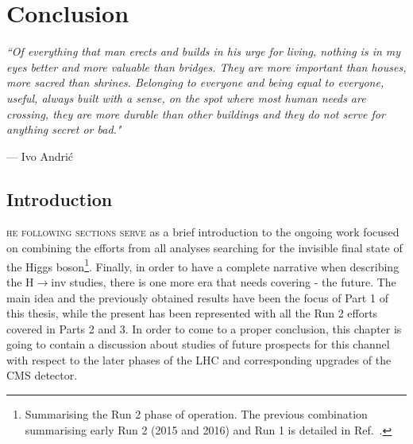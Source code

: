 \chapter{Conclusion}
\label{ch:conclusion}
\epigraph{\itshape``Of everything that man erects and builds in his urge for living, nothing is in my eyes better and more valuable than bridges. They are more important than houses, more sacred than shrines. Belonging to everyone and being equal to everyone, useful, always built with a sense, on the spot where most human needs are crossing, they are more durable than other buildings and they do not serve for anything secret or bad."}{--- \textup{Ivo Andri\' c}}

\section{Introduction}
\hspace{10pt}\lettrine[lines=2]{}{he following sections serve} as a brief introduction to the ongoing work focused on combining the efforts from all analyses searching for the invisible final state of the Higgs boson\footnote{Summarising the Run 2 phase of operation. The previous combination summarising early Run 2 (2015 and 2016) and Run 1 is detailed in Ref.~\cite{paper:HIG_17_023}.}. %
Finally, in order to have a complete narrative when describing the H$\rightarrow$inv studies, there is one more era that needs covering - the future. The main idea and the previously obtained results have been the focus of Part 1 of this thesis, while the present has been represented with all the Run 2 efforts covered in Parts 2 and 3. In order to come to a proper conclusion, this chapter is going to contain a discussion about studies of future prospects for this channel with respect to the later phases of the LHC and corresponding upgrades of the CMS detector.

